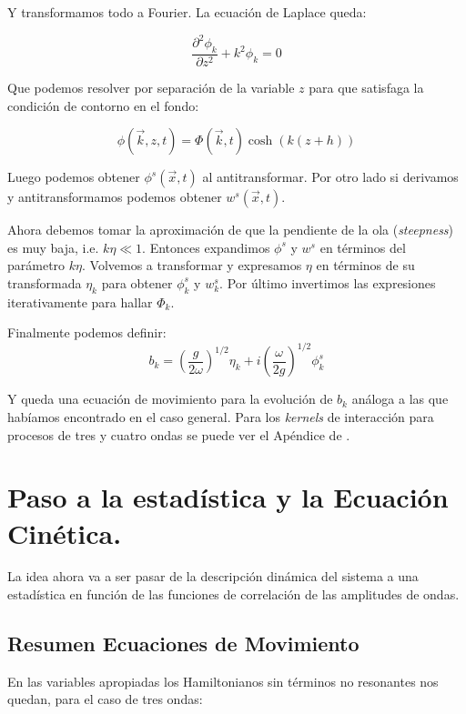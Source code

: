 Y transformamos todo a Fourier. La ecuación de Laplace queda:

\begin{equation}
	\frac{\partial^2\phi_k}{\partial z^2} + k^2 \phi_k = 0
\end{equation}

Que podemos resolver por separación de la variable $z$ para que satisfaga la condición de contorno en el fondo:

\begin{equation}
	\phi(\vec k, z, t) = \Phi(\vec k, t) \cosh(k(z+h))
\end{equation}

Luego podemos obtener $\phi^s(\vec x, t)$ al antitransformar. Por otro lado si derivamos y antitransformamos podemos obtener $w^s(\vec x, t)$.

Ahora debemos tomar la aproximación de que la pendiente de la ola (\textit{steepness}) es muy baja, i.e. $k\eta\ll1$. Entonces expandimos $\phi^s$ y $w^s$ en términos del parámetro $k\eta$. Volvemos a transformar y expresamos $\eta$ en términos de su transformada $\eta_k$ para obtener $\phi^s_k$ y $w^s_k$. Por último invertimos las expresiones iterativamente para hallar $\Phi_k$. 

Finalmente podemos definir:
\begin{equation}
	b_k = \left(\frac{g}{2\omega}\right)^{1/2} \eta_k + i \left(\frac{\omega}{2g}\right)^{1/2}\phi^s_k
\end{equation}

Y queda una ecuación de movimiento para la evolución de $b_k$ análoga a las que habíamos encontrado en el caso general. Para los \textit{kernels} de interacción para procesos de tres y cuatro ondas se puede ver el Apéndice de \cite{meiTheoryApplicationsOcean2016}.


\section{Paso a la estadística y la Ecuación Cinética.}
La idea ahora va a ser pasar de la descripción dinámica del sistema a una estadística en función de las funciones de correlación de las amplitudes de ondas.

\subsection*{Resumen Ecuaciones de Movimiento}
En las variables apropiadas los Hamiltonianos sin términos no resonantes nos quedan, para el caso de tres ondas: 


